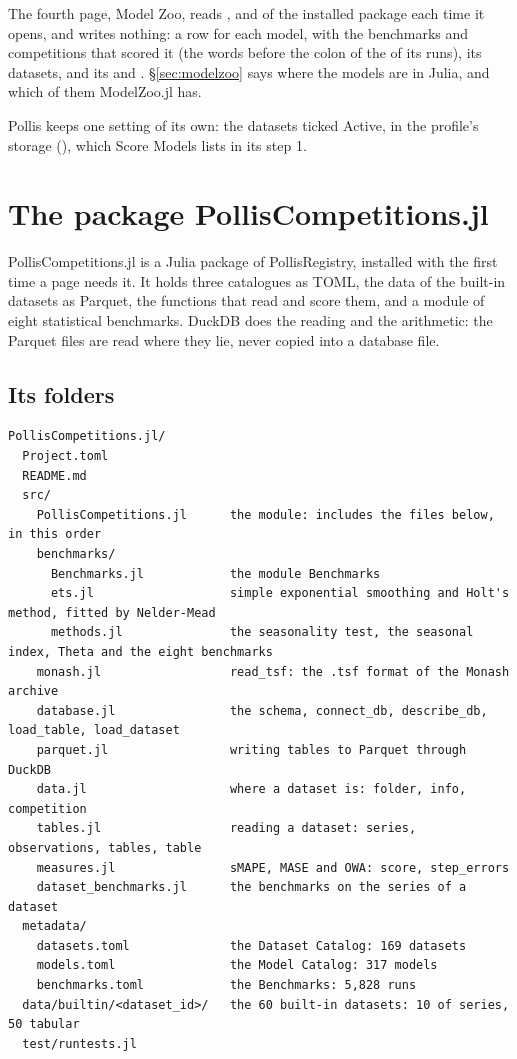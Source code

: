 The fourth page, Model Zoo, reads ,  and
 of the installed package each time it opens, and writes nothing: a row for each model,
with the benchmarks and competitions that scored it (the words before the colon of the  of its
runs), its datasets, and its  and . \S\ref{sec:modelzoo} says where the
models are in Julia, and which of them ModelZoo.jl has.

Pollis keeps one setting of its own: the datasets ticked Active, in the profile's storage
(), which Score Models lists in its step 1.

\section{The package PollisCompetitions.jl}
\label{sec:package}

PollisCompetitions.jl is a Julia package of PollisRegistry, installed with  the
first time a page needs it. It holds three catalogues as TOML, the data of the built-in datasets as Parquet, the
functions that read and score them, and a module of eight statistical benchmarks. DuckDB
 does the reading and the arithmetic: the Parquet files are read where
they lie, never copied into a database file.

\subsection{Its folders}

\begin{lstlisting}
PollisCompetitions.jl/
  Project.toml
  README.md
  src/
    PollisCompetitions.jl      the module: includes the files below, in this order
    benchmarks/
      Benchmarks.jl            the module Benchmarks
      ets.jl                   simple exponential smoothing and Holt's method, fitted by Nelder-Mead
      methods.jl               the seasonality test, the seasonal index, Theta and the eight benchmarks
    monash.jl                  read_tsf: the .tsf format of the Monash archive
    database.jl                the schema, connect_db, describe_db, load_table, load_dataset
    parquet.jl                 writing tables to Parquet through DuckDB
    data.jl                    where a dataset is: folder, info, competition
    tables.jl                  reading a dataset: series, observations, tables, table
    measures.jl                sMAPE, MASE and OWA: score, step_errors
    dataset_benchmarks.jl      the benchmarks on the series of a dataset
  metadata/
    datasets.toml              the Dataset Catalog: 169 datasets
    models.toml                the Model Catalog: 317 models
    benchmarks.toml            the Benchmarks: 5,828 runs
  data/builtin/<dataset_id>/   the 60 built-in datasets: 10 of series, 50 tabular
  test/runtests.jl
\end{lstlisting}

